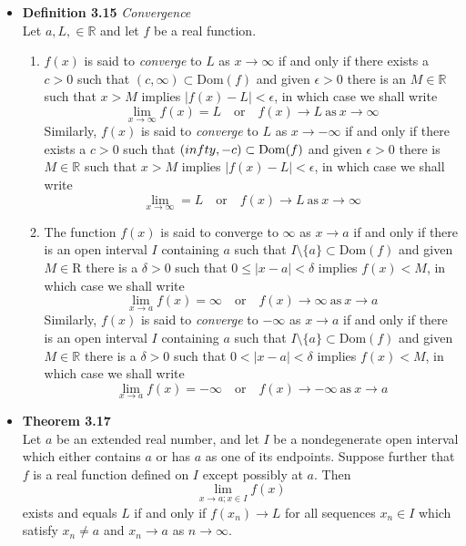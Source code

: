 \documentclass[11pt,a4paper]{article}
\begin{document}
\begin{itemize}
    \item \textbf{Definition 3.15} \emph{Convergence} \\
        Let $a, L, \in \mathbb{R}$ and let $f$ be a real function.
        \begin{enumerate}
            \item $f(x)$ is said to \emph{converge} to $L$ as $x \to \infty$ if and only if
                there exists a $c > 0$ such that $(c, \infty) \subset \mathrm{Dom}(f)$
                and given $\epsilon > 0$ there is an $M \in \mathbb{R}$ such that
                $x > M$ implies $|f(x) - L| < \epsilon$, in which case we shall write
                \[
                    \lim_{x \to \infty} f(x) = L \quad \text{or} \quad
                    f(x) \to L \ \text{as} \ x \to \infty
                \]
                Similarly, $f(x)$ is said to \emph{converge} to $L$ as $x \to -\infty$
                if and only if there exists a $c > 0$ such that
                $(\-infty, -c) \subset \mathrm{Dom}(f)$ and given $\epsilon > 0$ there is
                $M \in \mathbb{R}$ such that $x > M$ implies $|f(x) - L| < \epsilon$,
                in which case we shall write
                \[
                    \lim_{x \to \infty} = L \quad \text{or} \quad
                    f(x) \to L \ \text{as} \ x \to \infty
                \]
            \item The function $f(x)$ is said to converge to $\infty$ as $x \to a$
                if and only if there is an open interval $I$ containing $a$ such that
                $I \setminus \{a\} \subset \mathrm{Dom}(f)$ and given $M \in \mathrm{R}$
                there is a $\delta > 0$ such that $0 \leq |x - a| < \delta$ implies
                $f(x) < M$, in which case we shall write
                \[
                    \lim_{x \to a} f(x) = \infty \quad \text{or} \quad
                    f(x) \to \infty \ \text{as} \ x \to a
                \]
                Similarly, $f(x)$ is said to \emph{converge} to $-\infty$ as $x \to a$
                if and only if there is an open interval $I$ containing $a$ such that
                $I \setminus \{a\} \subset \mathrm{Dom}(f)$ and given $M \in \mathbb{R}$
                there is a $\delta > 0$ such that $0 < |x-a| < \delta$ implies $f(x) < M$,
                in which case we shall write
                \[
                    \lim_{x \to a} f(x) = -\infty \quad \text{or} \quad
                    f(x) \to -\infty \ \text{as} \ x \to a
                \]
        \end{enumerate}
    \item \textbf{Theorem 3.17} \\
        Let $a$ be an extended real number, and let $I$ be a nondegenerate open interval which
        either contains $a$ or has $a$ as one of its endpoints.
        Suppose further that $f$ is a real function defined on $I$ except possibly at $a$.
        Then
        \[
            \lim_{x \to a; x \in I} f(x)
        \]
        exists and equals $L$ if and only if $f(x_n) \to L$ for all sequences $x_n \in I$
        which satisfy $x_n \neq a$ and $x_n \to a$ as $n \to \infty$.
\end{itemize}
\end{document}
